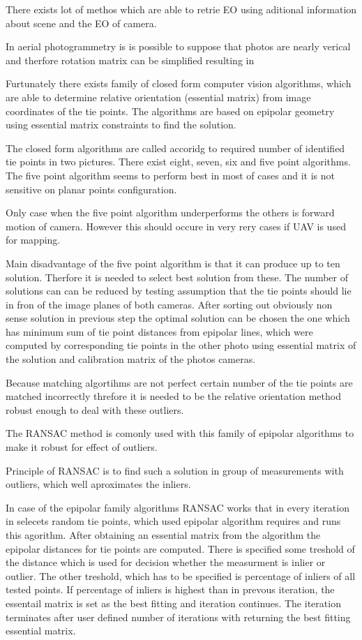 \documentclass[a4paper,12pt]{report}
\begin{document}
\begin{itemize}
There exists lot of methos which are able to retrie EO using aditional 
information about scene and the EO of camera.

In aerial photogrammetry is is possible to suppose that photos are nearly verical and therfore 
rotation matrix can be simplified resulting in 

Furtunately there exists family of closed form computer vision algorithms,
which are able to determine relative orientation (essential matrix) from image coordinates 
of the tie points. The algorithms are based on epipolar geometry using essential matrix 
constraints to find the solution. 

The closed form algorithms are called accoridg to required number of identified tie points in two pictures.
There exist eight, seven, six and five point algorithms. The five point algorithm seems to perform best in most
of cases \cite{stewenius2006recent} and it is not sensitive on planar points configuration.

Only case when the five point algorithm \cite{nister2004efficient} underperforms 
\cite{bruckner2008experimental} the others is forward motion of camera.
However this should occure in very rery cases  if UAV is used for mapping.

Main disadvantage of the five point algorithm is that it can produce up to ten solution.
Therfore it is needed to select best solution from these. The number of solutions can
can be reduced by testing assumption that the tie points should lie in fron of the image 
planes of both cameras. After sorting out obviously non sense solution in previous step
 the optimal solution can be chosen the one which has minimum sum of tie point distances
 from epipolar lines, which were computed by corresponding tie points in the other photo
 using essential matrix of the solution and calibration matrix of the photos cameras.  

Because matching algortihms are not perfect  certain number of the tie points are matched 
incorrectly threfore it is needed to be the relative orientation method robust enough to
deal with these outliers.

The RANSAC \cite{RANSAC} method is comonly used with this family of epipolar algorithms to 
make it robust for effect of outliers.

Principle of RANSAC is to find such  a solution in group of measurements with outliers, 
which well aproximates the inliers. 

In case of the epipolar family algorithms RANSAC works that in every iteration 
in selecets random tie points, which used epipolar algorithm requires and 
runs this agorithm. After obtaining an essential matrix from the algorithm the epipolar 
distances for tie points are computed. There is specified some treshold of the distance which is used 
for decision whether the measurment is inlier or outlier. The other treshold, which has to be specified 
is percentage of inliers of all tested points. If percentage of inliers is highest than in prevous iteration,
the essentail matrix is set as the best fitting and iteration continues. The iteration terminates after user defined 
number of iterations with returning the best fitting essential matrix.


\end{itemize}
\end{document}
